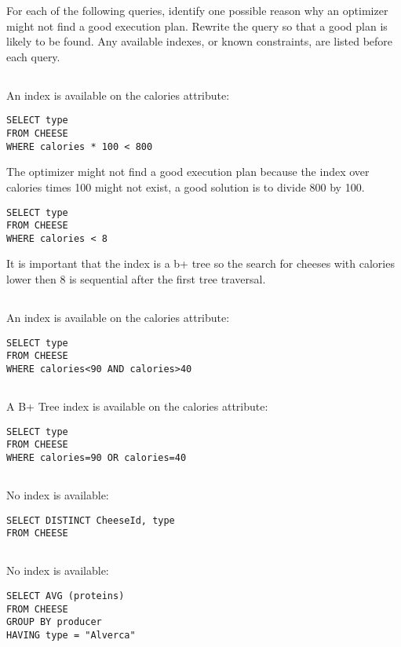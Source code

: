{\color{gray} For each of the following queries, identify one possible reason why an optimizer might not find a good
execution plan. Rewrite the query so that a good plan is likely to be found. Any available indexes, or known
constraints, are listed before each query.}

{\color{gray}\subsection{} An index is available on the calories attribute:}

\begin{lstlisting}
SELECT type
FROM CHEESE
WHERE calories * 100 < 800
\end{lstlisting}

The optimizer might not find a good execution plan because the index over calories times 100 might not exist, a good solution is to divide 800 by 100.

\begin{lstlisting}
SELECT type
FROM CHEESE
WHERE calories < 8
\end{lstlisting}

It is important that the index is a b+ tree so the search for cheeses with calories lower then 8 is sequential after the first tree traversal.

{\color{gray}\subsection{} An index is available on the calories attribute:}

\begin{lstlisting}
SELECT type
FROM CHEESE
WHERE calories<90 AND calories>40
\end{lstlisting}

{\color{gray}\subsection{} A B+ Tree index is available on the calories attribute:}

\begin{lstlisting}
SELECT type
FROM CHEESE
WHERE calories=90 OR calories=40
\end{lstlisting}

{\color{gray}\subsection{} No index is available:}

\begin{lstlisting}
SELECT DISTINCT CheeseId, type
FROM CHEESE 
\end{lstlisting}

{\color{gray}\subsection{} No index is available:}

\begin{lstlisting}
SELECT AVG (proteins)
FROM CHEESE
GROUP BY producer
HAVING type = "Alverca"
\end{lstlisting}

